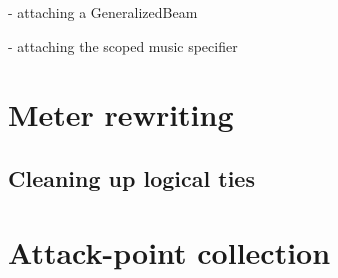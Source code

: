 - attaching a GeneralizedBeam

- attaching the scoped music specifier

\section{Meter rewriting}

\subsection{Cleaning up logical ties}

\section{Attack-point collection}
